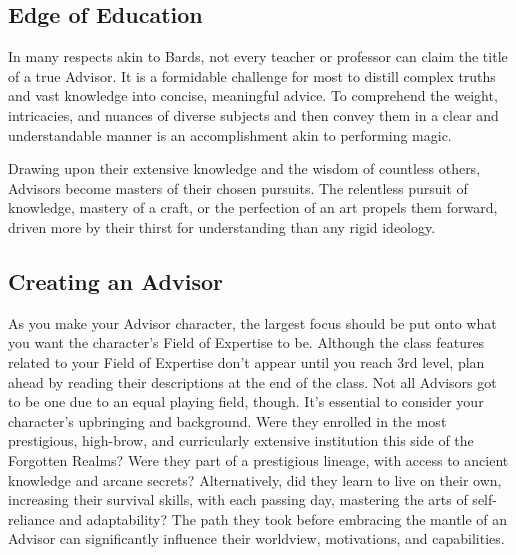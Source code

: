 \documentclass[letterpaper,openany,twoside,twocolumn]{book}
\begin{document}
	\subsection{Edge of Education}
	In many respects akin to Bards, not every teacher or professor can claim the title of a true Advisor. It is a formidable challenge for most to distill complex truths and vast knowledge into concise, meaningful advice. To comprehend the weight, intricacies, and nuances of diverse subjects and then convey them in a clear and understandable manner is an accomplishment akin to performing magic.

	Drawing upon their extensive knowledge and the wisdom of countless others, Advisors become masters of their chosen pursuits. The relentless pursuit of knowledge, mastery of a craft, or the perfection of an art propels them forward, driven more by their thirst for understanding than any rigid ideology.
	\vfill\eject
	\vspace*{20cm}
	\subsection{Creating an Advisor}
	As you make your Advisor character, the largest focus should be put onto what you want the character's Field of Expertise to be. Although the class features related to your Field of Expertise don't appear until you reach 3rd level, plan ahead by reading their descriptions at the end of the class.
	\clearpage
	\noindent Not all Advisors got to be one due to an equal playing field, though. It's essential to consider your character's upbringing and background. Were they enrolled in the most prestigious, high-brow, and curricularly extensive institution this side of the Forgotten Realms? Were they part of a prestigious lineage, with access to ancient knowledge and arcane secrets? Alternatively, did they learn to live on their own, increasing their survival skills, with each passing day, mastering the arts of self-reliance and adaptability? The path they took before embracing the mantle of an Advisor can significantly influence their worldview, motivations, and capabilities.
	
	
	
	
\end{document}
